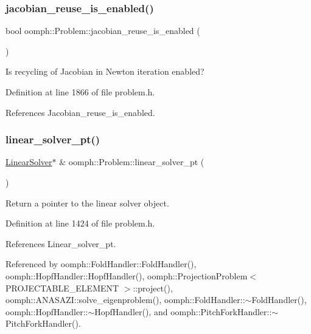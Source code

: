 \subsubsection{\texorpdfstring{jacobian\+\_\+reuse\+\_\+is\+\_\+enabled()}{jacobian\_reuse\_is\_enabled()}}
{\footnotesize\ttfamily bool oomph\+::\+Problem\+::jacobian\+\_\+reuse\+\_\+is\+\_\+enabled (\begin{DoxyParamCaption}{ }\end{DoxyParamCaption})\hspace{0.3cm}{\ttfamily [inline]}}



Is recycling of Jacobian in Newton iteration enabled? 



Definition at line 1866 of file problem.\+h.



References Jacobian\+\_\+reuse\+\_\+is\+\_\+enabled.

\mbox{\label{classoomph_1_1Problem_a27df2f59b7e602251fb5b687821a8aee}} 
\subsubsection{\texorpdfstring{linear\+\_\+solver\+\_\+pt()}{linear\_solver\_pt()}\hspace{0.1cm}{\footnotesize\ttfamily [1/2]}}
{\footnotesize\ttfamily \hyperlink{classoomph_1_1LinearSolver}{Linear\+Solver}$\ast$ \& oomph\+::\+Problem\+::linear\+\_\+solver\+\_\+pt (\begin{DoxyParamCaption}{ }\end{DoxyParamCaption})\hspace{0.3cm}{\ttfamily [inline]}}



Return a pointer to the linear solver object. 



Definition at line 1424 of file problem.\+h.



References Linear\+\_\+solver\+\_\+pt.



Referenced by oomph\+::\+Fold\+Handler\+::\+Fold\+Handler(), oomph\+::\+Hopf\+Handler\+::\+Hopf\+Handler(), oomph\+::\+Projection\+Problem$<$ P\+R\+O\+J\+E\+C\+T\+A\+B\+L\+E\+\_\+\+E\+L\+E\+M\+E\+N\+T $>$\+::project(), oomph\+::\+A\+N\+A\+S\+A\+Z\+I\+::solve\+\_\+eigenproblem(), oomph\+::\+Fold\+Handler\+::$\sim$\+Fold\+Handler(), oomph\+::\+Hopf\+Handler\+::$\sim$\+Hopf\+Handler(), and oomph\+::\+Pitch\+Fork\+Handler\+::$\sim$\+Pitch\+Fork\+Handler().

